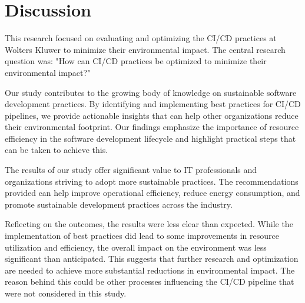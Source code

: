 
\chapter{Discussion}%
\label{ch:discussion}


This research focused on evaluating and optimizing the CI/CD practices at Wolters Kluwer to minimize their environmental impact. The central research question was: "How can CI/CD practices be optimized to minimize their environmental impact?"

Our study contributes to the growing body of knowledge on sustainable software development practices. By identifying and implementing best practices for CI/CD pipelines, we provide actionable insights that can help other organizations reduce their environmental footprint. Our findings emphasize the importance of resource efficiency in the software development lifecycle and highlight practical steps that can be taken to achieve this.

The results of our study offer significant value to IT professionals and organizations striving to adopt more sustainable practices. The recommendations provided can help improve operational efficiency, reduce energy consumption, and promote sustainable development practices across the industry.

Reflecting on the outcomes, the results were less clear than expected. While the implementation of best practices did lead to some improvements in resource utilization and efficiency, the overall impact on the environment was less significant than anticipated. This suggests that further research and optimization are needed to achieve more substantial reductions in environmental impact. The reason behind this could be other processes influencing the CI/CD pipeline that were not considered in this study.

